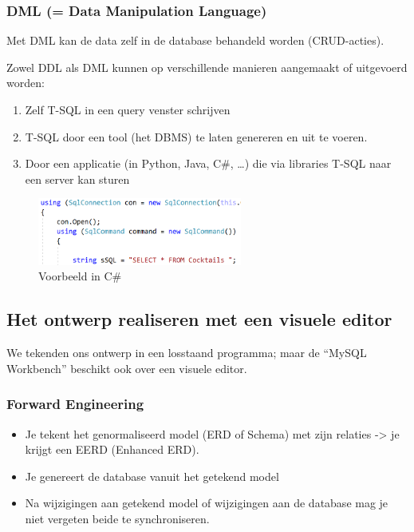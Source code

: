 \documentclass{article}
\begin{document}
\subsubsection{DML (= Data Manipulation Language)}
Met DML kan de data zelf in de database behandeld worden (CRUD-acties).

Zowel DDL als DML kunnen op verschillende manieren aangemaakt of uitgevoerd worden:

\begin{enumerate}
    \item Zelf T-SQL in een query venster schrijven
    \item T-SQL door een tool (het DBMS) te laten genereren en uit te voeren.
    \item Door een applicatie (in Python, Java, C\#, \dots) die via libraries T-SQL naar een server kan sturen
\end{enumerate}

\begin{figure}[H]
    \centering
    \includegraphics[width=0.6\textwidth]{t-sql-csharp.png}
    \caption{Voorbeeld in C\#}
\end{figure}

\subsection{Het ontwerp realiseren met een visuele editor}
We tekenden ons ontwerp in een losstaand programma; maar de “MySQL Workbench” beschikt ook over een
visuele editor.

\subsubsection{Forward Engineering}

\begin{itemize}
    \item Je tekent het genormaliseerd model (ERD of Schema) met zijn relaties -> je krijgt een EERD (Enhanced ERD).
    \item Je genereert de database vanuit het getekend model
    \item Na wijzigingen aan getekend model of wijzigingen aan de database mag je niet vergeten beide te synchroniseren.
\end{itemize}
\end{document}
